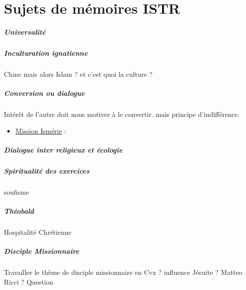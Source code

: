 \chapter{Sujets de mémoires ISTR}

\paragraph{Universalité}

\paragraph{Inculturation ignatienne} Chine mais alors Islam ? et c'est quoi la culture ?

\paragraph{Conversion ou dialogue} Intérêt de l'autre doit nous motiver à le convertir. mais principe d'indifférence. 
\begin{itemize}
    \item \href{https://mission-ismerie.com/}{Mission Ismérie}  : 
\end{itemize}

\paragraph{Dialogue inter religieux et écologie}

\paragraph{Spiritualité des exercices} soufisme

\paragraph{Théobald} Hospitalité Chrétienne

\paragraph{Disciple Missionnaire} Travailler le thème de disciple
missionnaire en Cvx ? influence
Jésuite ? Matteo Ricci ? Question

